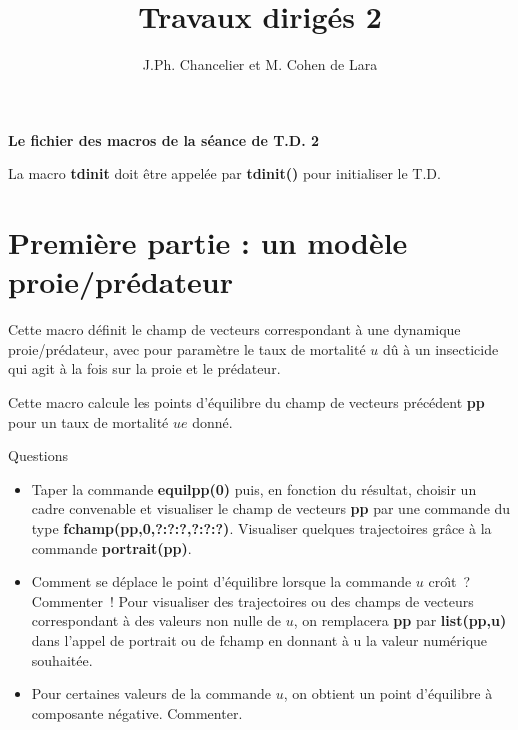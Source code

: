 \textheight=660pt 
\textwidth=470pt 
\topmargin=-27pt 
\oddsidemargin=0pt 
\evensidemargin=0pt 
\title{Travaux dirig\'es 2}
\author{J.Ph. Chancelier et M. Cohen de Lara}

\maketitle 
\def\cmarg{\hspace{1cm}}
\def\tit#1{ \begin{center} \fbox{{\bf  #1}} \end{center}}


\centerline{{\bf Le fichier des macros de la s\'eance de T.D. 2}}

\Mhlp

La macro {\bf tdinit} doit \^etre appel\'ee par {\bf tdinit()} pour initialiser
le T.D.

\Mtdinit

\section{Premi\`ere partie : un mod\`ele proie/pr\'edateur}

\tit{pp}

Cette macro d\'efinit le champ de vecteurs correspondant \`a une dynamique
proie/pr\'edateur, avec pour param\`etre le taux de mortalit\'e $u$ d\^u \`a 
un insecticide qui agit \`a la fois sur la proie et le pr\'edateur.
\medskip

\Mpp

\tit{equilpp}

Cette macro calcule les points d'\'equilibre du champ de vecteurs
pr\'ec\'edent {\bf pp} pour un taux de mortalit\'e $ue$ donn\'e.
\medskip

\Mequilpp

\centerline{{\sc Questions}}

\begin{itemize}
\item Taper la commande {\bf equilpp(0)} puis, en fonction du
r\'esultat, choisir un cadre convenable et visualiser le champ de
vecteurs {\bf pp} par une commande du type 
{\bf fchamp(pp,0,?:?:?,?:?:?)}. Visualiser quelques trajectoires
gr\^ace \`a la commande {\bf portrait(pp)}.
\item Comment se d\'eplace le point d'\'equilibre lorsque la commande $u$
cro\^{\i}t~? Commenter~!  Pour visualiser des trajectoires ou des champs de vecteurs correspondant \`a des valeurs non nulle de $u$,
 on remplacera {\bf pp} par {\bf list(pp,u)} dans l'appel de portrait 
ou de fchamp en donnant \`a u la valeur num\'erique souhait\'ee.
\item Pour certaines valeurs de la commande $u$, on obtient un point 
d'\'equilibre \`a composante n\'egative. Commenter.
\end{itemize}



